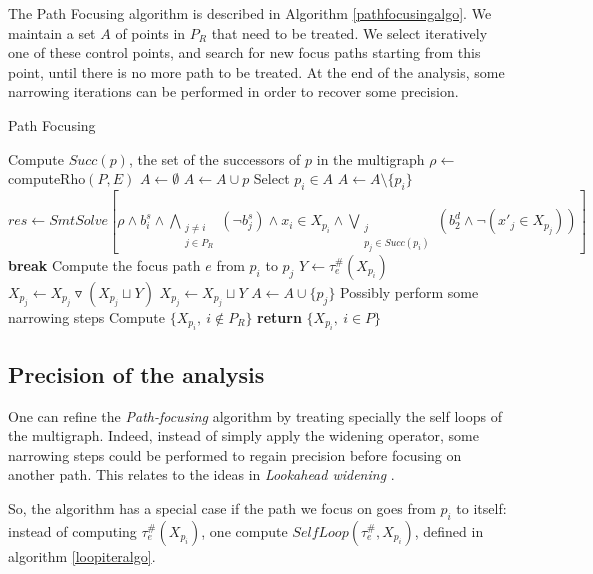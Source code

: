 \documentclass[a4paper,english,titlepage,11pt]{report}
\newcommand{\widening}{\mathop{\triangledown}}
\begin{document}
	The Path Focusing algorithm is described in Algorithm \ref{pathfocusingalgo}.
	We maintain a set $A$ of points in $P_R$ that need to be treated.
	We select iteratively one of these control points, and search for new focus
	paths starting from this point, until there is no more path to be treated.
	At the end of the analysis, some narrowing iterations can be performed in
	order to recover some precision.
\begin{algorithm}
\caption{Path Focusing}\label{pathfocusingalgo}
\begin{algorithmic}[1] 
	\State Compute $Succ(p)$, the set of the successors of $p$ in the multigraph
\EndFor
\State $\rho \gets$ computeRho$(P,E)$
\State $A \gets \emptyset$
	\State $A \gets A \cup p$
\EndFor
{}
	\State Select $p_i \in A$
	\State $A \gets A \setminus \{p_i\}$
		\State $res \gets SmtSolve\left[\rho \wedge b_i^s \wedge
		\displaystyle\bigwedge_{\substack{j\neq i \\
		j\in P_R}} (\neg b_j^s) \wedge x_i \in X_{p_i} \wedge
		\bigvee_{\substack{j \\ p_j\in Succ(p_i)}} \left(b_2^d \wedge \neg (x'_j \in
		X_{p_j})\right)\right]$
			\State \textbf{break}
		\EndIf
		\State Compute the focus path $e$ from $p_i$ to $p_j$
		\State $Y \gets \tau_e^\#(X_{p_i})$
			\State $X_{p_j} \gets X_{p_j} \widening (X_{p_j} \sqcup Y)$
		\Else
			\State $X_{p_j} \gets X_{p_j} \sqcup Y$
		\EndIf
		\State $A \gets A \cup \{p_j\}$
	\EndWhile
\EndWhile
\State Possibly perform some narrowing steps
\State Compute $\{X_{p_i},\ i \notin P_R\}$
\State \textbf{return} $\{X_{p_i},\ i \in P\}$
\EndProcedure
\end{algorithmic}
\end{algorithm}

	\subsection {Precision of the analysis}

	One can refine the \emph{Path-focusing} algorithm by treating specially the
	self loops of the multigraph. Indeed, instead of simply apply the widening
	operator,  some narrowing steps could be performed to regain precision
	before focusing on another path. This relates to the ideas in
        \emph{Lookahead widening} \cite{GopanR06}.

	So, the algorithm has a special case if the path we focus on goes from $p_i$
	to itself: instead of computing $\tau_e^\#(X_{p_i})$, one compute
	$SelfLoop(\tau_e^\#,X_{p_i})$, defined in algorithm \ref{loopiteralgo}.
\end{document}

